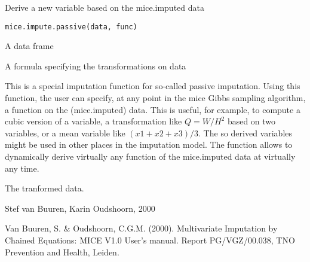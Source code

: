 \documentclass{article}
\begin{document}
\begin{Description}\relax
Derive a new variable based on the mice.imputed data
\end{Description}
\begin{Usage}
\begin{verbatim}
mice.impute.passive(data, func)
\end{verbatim}
\end{Usage}
\begin{Arguments}
\begin{ldescription}
\item[\code{data}] A data frame
\item[\code{func}] A formula specifying the transformations on data
\end{ldescription}
\end{Arguments}
\begin{Details}\relax
This is a special imputation function for so-called passive imputation.
Using this function, the user can specify, at any point in the mice 
Gibbs sampling algorithm, a function on the (mice.imputed) data. 
This is useful, for example, to compute a cubic version
of a variable, a transformation like $Q=W/H^2$ based on two variables, 
or a mean variable like $(x1+x2+x3)/3$. The so derived variables might be
used in other places in the imputation model.
The function allows to dynamically derive virtually any function 
of the mice.imputed data at virtually any time.
\end{Details}
\begin{Value}
\begin{ldescription}
\item[\code{t}] The tranformed data.
\end{ldescription}
\end{Value}
\begin{Author}\relax
Stef van Buuren, Karin Oudshoorn, 2000
\end{Author}
\begin{References}\relax
Van Buuren, S. \& Oudshoorn, C.G.M. (2000). Multivariate Imputation by Chained Equations: 
MICE V1.0 User's manual. Report PG/VGZ/00.038, TNO Prevention and Health, Leiden.
\end{References}
\begin{SeeAlso}\relax
{}
\end{SeeAlso}
\end{document}
